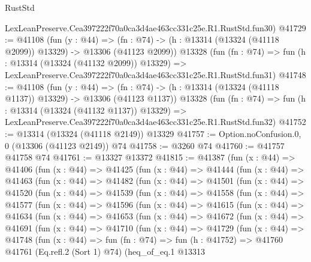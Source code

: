 \begin{lexlean}{RustStd}
\begin{coremodule}
    LexLeanPreserve.Cea397222f70a0ca3d4ae463cc331c25e.R1.RustStd.fun30)
@41729 := @41108
    (fun (y : @44) =>
    (fn : @74) -> (h : @13314 (@13324 (@41118 @2099)) @13329) -> @13306 (@41123 @2099))
    @13328
    (fun (fn : @74) =>
    fun (h : @13314 (@13324 (@41132 @2099)) @13329) =>
    LexLeanPreserve.Cea397222f70a0ca3d4ae463cc331c25e.R1.RustStd.fun31)
@41748 := @41108
    (fun (y : @44) =>
    (fn : @74) -> (h : @13314 (@13324 (@41118 @1137)) @13329) -> @13306 (@41123 @1137))
    @13328
    (fun (fn : @74) =>
    fun (h : @13314 (@13324 (@41132 @1137)) @13329) =>
    LexLeanPreserve.Cea397222f70a0ca3d4ae463cc331c25e.R1.RustStd.fun32)
@41752 := @13314 (@13324 (@41118 @2149)) @13329
@41757 := Option.noConfusion.{0, 0} (@13306 (@41123 @2149)) @74
@41758 := @3260 @74
@41760 := @41757 @41758 @74
@41761 := @13327 @13372
@41815 := @41387
    (fun (x : @44) =>
    @41406
      (fun (x : @44) =>
      @41425
        (fun (x : @44) =>
        @41444
          (fun (x : @44) =>
          @41463
            (fun (x : @44) =>
            @41482
              (fun (x : @44) =>
              @41501
                (fun (x : @44) =>
                @41520
                  (fun (x : @44) =>
                  @41539
                    (fun (x : @44) =>
                    @41558
                      (fun (x : @44) =>
                      @41577
                        (fun (x : @44) =>
                        @41596
                          (fun (x : @44) =>
                          @41615
                            (fun (x : @44) =>
                            @41634
                              (fun (x : @44) =>
                              @41653
                                (fun (x : @44) =>
                                @41672
                                  (fun (x : @44) =>
                                  @41691
                                    (fun (x : @44) =>
                                    @41710
                                      (fun (x : @44) =>
                                      @41729
                                        (fun (x : @44) =>
                                        @41748
                                          (fun (x : @44) =>
                                          fun (fn : @74) =>
                                          fun (h : @41752) =>
                                          @41760
                                            @41761
                                            (Eq.refl.{2} (Sort 1) @74)
                                            (heq_of_eq.{1}
                                              @13313

\end{coremodule}
\end{lexlean}
